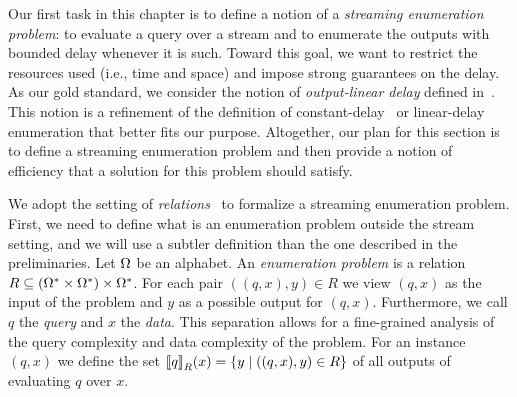 


Our first task in this chapter is to define a notion of a \emph{streaming enumeration problem}: to evaluate a query over a stream and to enumerate the outputs with bounded delay whenever it is such. Toward this goal, we want to restrict the resources used (i.e., time and space) and impose strong guarantees on the delay. As our gold standard, we consider the notion of \emph{output-linear delay} defined in~\cite{FlorenzanoRUVV20}. This notion is a refinement of the definition of constant-delay~\cite{Segoufin13} or linear-delay~\cite{Courcelle09} enumeration that better fits our purpose. Altogether, our plan for this section is to define a streaming enumeration problem and then provide a notion of efficiency that a solution for this problem should satisfy. 

We adopt the setting of \emph{relations}~\cite{jerrum1986random,ArenasCJR19} to formalize a streaming enumeration problem. First, we need to define what is an enumeration problem outside the stream setting, and we will use a subtler definition than the one described in the preliminaries. 
Let $\Omega$  be an alphabet. An \emph{enumeration problem} is a relation $R\subseteq (\Omega^{*} \times \Omega^*) \times\Omega^{*}$. For each pair $((q, x), y) \in R$ we view $(q, x)$ as the input of the problem and $y$ as a possible output for $(q, x)$. 
Furthermore, we call $q$ the \emph{query} and $x$ the \emph{data}.
This separation allows for a fine-grained analysis of the query complexity and data complexity of the problem. 
For an instance $(q, x)$ we define the set ${\llbracket{q}\rrbracket}_{R}(x) = \{y \mid ((q,x), y)\in R\}$ of all outputs of evaluating $q$ over $x$.

